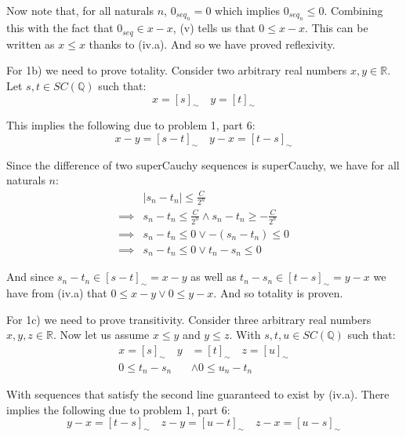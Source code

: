 \documentclass{article}
\begin{document}
Now note that, for all naturals $n$, $0_{seq_n}=0$ which implies $0_{seq_n}\le0$. Combining this with the fact that $0_{seq}\in x-x$, (v) tells us that $0\le x-x$. This can be written as $x\le x$ thanks to (iv.a). And so we have proved reflexivity.
\medskip

For 1b) we need to prove totality. Consider two arbitrary real numbers $x,y\in\mathbb R$. Let $s,t\in SC(\mathbb Q)$ such that:
\begin{equation*}
    x=[s]_\sim\quad y=[t]_\sim
\end{equation*}

This implies the following due to problem 1, part 6:
\begin{equation*}
    x-y=[s-t]_\sim\quad y-x=[t-s]_\sim
\end{equation*}

Since the difference of two superCauchy sequences is superCauchy, we have for all naturals $n$:
\begin{align*}
    &|s_n-t_n|\le \frac{C}{2^n}\\
    \implies&s_n-t_n\le\frac{C}{2^n}\wedge s_n-t_n\ge-\frac{C}{2^n}\\
    \implies&s_n-t_n\le0\vee -(s_n-t_n)\le0\tag{0 in interval}\\
    \implies&s_n-t_n\le0\vee t_n-s_n\le0
\end{align*}

And since $s_n-t_n\in[s-t]_\sim=x-y$ as well as $t_n-s_n\in[t-s]_\sim=y-x$ we have from (iv.a) that $0\le x-y\vee 0\le y-x$. And so totality is proven.
\medskip

For 1c) we need to prove transitivity. Consider three arbitrary real numbers $x,y,z\in\mathbb R$. Now let us assume $x\le y$ and $y\le z$. With $s,t,u\in SC(\mathbb Q)$ such that:
\begin{align*}
    x=[s]_\sim\quad y&=[t]_\sim\quad z=[u]_\sim\\
    0\le t_n-s_n&\wedge 0\le u_n-t_n
\end{align*}

With sequences that satisfy the second line guaranteed to exist by (iv.a). There implies the following due to problem 1, part 6:
\begin{equation*}
    y-x=[t-s]_\sim\quad z-y=[u-t]_\sim\quad z-x=[u-s]_\sim
\end{equation*}
\end{document}
